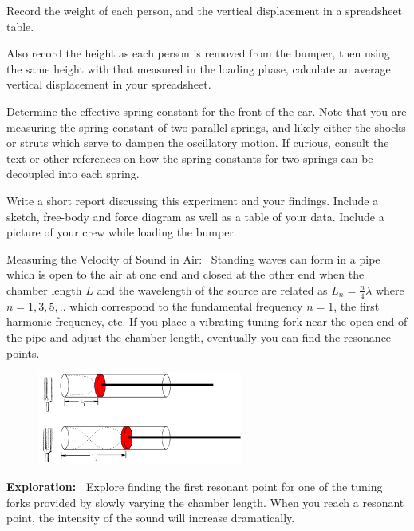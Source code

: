 \documentclass[14pt]{article}
\newcommand{\subheading}[1]{{\boldtenrm #1}}
\begin{document}
Record the weight of each person, and the vertical displacement in a spreadsheet table.

Also record the height as each person is removed from the bumper, then using the same height with
that measured in the loading phase, calculate an average vertical displacement in your spreadsheet.

Determine the effective spring constant for the front of the car. Note that you are measuring the spring constant of two parallel springs, and likely either the shocks or struts which serve to dampen the oscillatory motion. If curious, consult the text or other references on how the spring constants for two springs can be decoupled into each spring.

Write a short report discussing this experiment and your findings. Include a sketch, free-body and force diagram as well as a table of your data. Include a picture of your crew while loading the bumper.



\newpage 

\vphantom{test}

\subheading{Measuring the Velocity of Sound in Air:~}
Standing waves can form in a pipe which is open to the air at one end and closed at the other end when the chamber length $L$ and the wavelength of the source are related as $L_n=\frac{n}{4}\lambda$ where $n=1,3,5,..$ which correspond to the fundamental frequency $n=1$, the first harmonic frequency, etc.  If you place a vibrating tuning fork near the open end of the pipe and adjust the chamber length, eventually you can find the resonance points.


\begin{figure}[h]
\centering
\includegraphics[width=0.6\textwidth]{figs/sound_apparatus.png}
\end{figure}

\subheading{\bf Exploration:~}
Explore finding the first resonant point for one of the tuning forks provided by slowly varying the chamber length.
When you reach a resonant point, the intensity of the sound will increase dramatically.
\end{document}

